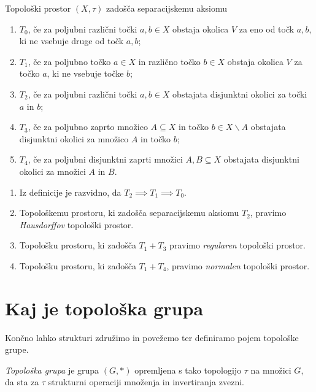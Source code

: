\documentclass[mat1]{fmfdelo}
\begin{document}
\begin{definicija}\label{def:sepaks}
	Topološki prostor $(X, \tau)$ zadošča separacijskemu aksiomu
	\begin{enumerate}
		\item $T_0$, če za poljubni različni točki $a, b \in X$ obstaja okolica $V$ za eno od točk $a, b$, ki ne vsebuje druge od točk $a, b$;
		\item $T_1$, če za poljubno točko $a \in X$ in različno točko $b \in X$ obstaja okolica $V$ za točko $a$, ki ne vsebuje točke $b$;
		\item $T_2$, če za poljubni različni točki $a, b \in X$ obstajata disjunktni okolici za točki $a$ in $b$;
		\item $T_3$, če za poljubno zaprto množico $A \subseteq X$ in točko $b \in X\backslash A$ obstajata disjunktni okolici za množico $A$ in točko $b$;
		\item $T_4$, če za poljubni disjunktni zaprti množici $A, B \subseteq X$ obstajata disjunktni okolici za množici $A$ in $B$.
	\end{enumerate}
\end{definicija}

\begin{opomba}
	\begin{enumerate}
		\item Iz definicije je razvidno, da $T_2 \implies T_1 \implies T_0$.
		\item Topološkemu prostoru, ki zadošča separacijskemu aksiomu $T_2$, pravimo \emph{Hausdorffov} topološki prostor.
		\item Topološku prostoru, ki zadošča $T_1+T_3$ pravimo \emph{regularen} topološki prostor.
		\item Topološku prostoru, ki zadošča $T_1+T_4$, pravimo \emph{normalen} topološki prostor.
	\end{enumerate}
\end{opomba}

\section{Kaj je topološka grupa}


Končno lahko strukturi združimo in povežemo ter definiramo pojem topološke grupe.
\begin{definicija}\label{def:topgrupa}
\emph{Topološka grupa} je grupa $(G, *)$ opremljena s tako topologijo $\tau$ na množici $G$, da sta za $\tau$ strukturni operaciji množenja in invertiranja zvezni. 
\end{definicija}
\end{document}
